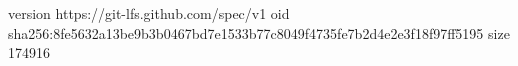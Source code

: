 version https://git-lfs.github.com/spec/v1
oid sha256:8fe5632a13be9b3b0467bd7e1533b77c8049f4735fe7b2d4e2e3f18f97ff5195
size 174916
